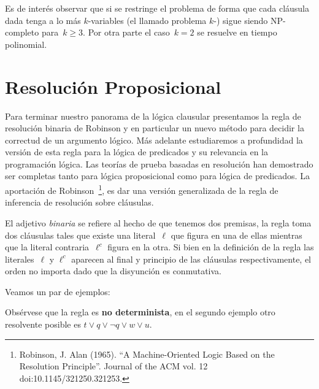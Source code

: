 \documentclass[11pt,letterpaper]{article}
\begin{document}
Es de interés observar que si se restringe el problema de forma que cada 
cláusula dada tenga a lo más $k$-variables (el llamado problema $k$-{\sat}) 
sigue siendo NP-completo para~$k\geq 3$. Por otra parte el caso~$k=2$ se 
resuelve en tiempo polinomial.



\section{Resolución Proposicional}

Para terminar nuestro panorama de la lógica clausular presentamos la regla de 
resolución binaria de Robinson y en particular un nuevo método para decidir la 
correctud de un argumento lógico. Más adelante estudiaremos a profundidad la 
versión de esta regla para la lógica de predicados y su relevancia en la 
programación lógica. Las teorías de prueba basadas en resolución han 
demostrado ser completas tanto para lógica proposicional como para lógica de 
predicados.
La aportación de Robinson~\footnote{Robinson, J. Alan (1965). \enquote{A 
Machine-Oriented Logic Based on the Resolution Principle}. Journal of the ACM 
vol. 12 doi:10.1145/321250.321253.}, es dar una versión generalizada de la 
regla de inferencia de resolución sobre cláusulas.

El adjetivo \textit{binaria} se refiere al hecho de que tenemos dos premisas,
la regla toma dos cláusulas tales que existe una literal~$\ell$ que figura en 
una de ellas mientras que la literal contraria~$\ell^c$ figura en la otra. Si 
bien en la definición de la regla las literales~$\ell$ y $\ell^c$ aparecen al 
final y principio de las cláusulas respectivamente, el orden no importa dado 
que la disyunción es conmutativa. 


\noindent Veamos un par de ejemplos:
\begin{mathpar}
 
\end{mathpar}
Obsérvese que la regla es \textbf{no determinista}, en el segundo ejemplo otro
resolvente posible es $t\lor q\lor \neg q\lor w\lor u$. \\
\end{document}
